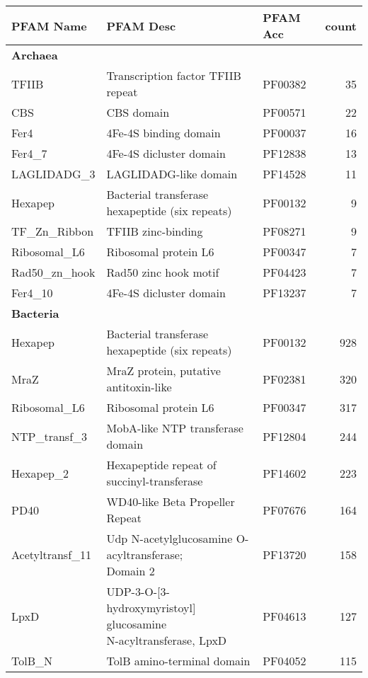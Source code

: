 \documentclass[a4,center,fleqn]{NAR}
\begin{document}
\clearpage
\begin{table*}[t]
\centering

\begin{tabular}{lllr}
  \hline
PFAM Name & PFAM Desc & PFAM Acc & count \\ 
  \hline
\multicolumn{4}{l}{\textbf{Archaea}}\\
TFIIB & Transcription factor TFIIB repeat & PF00382 &  35 \\ 
  CBS & CBS domain & PF00571 &  22 \\ 
  Fer4 & 4Fe-4S binding domain & PF00037 &  16 \\ 
  Fer4\_7 & 4Fe-4S dicluster domain & PF12838 &  13 \\ 
  LAGLIDADG\_3 & LAGLIDADG-like domain & PF14528 &  11 \\ 
  Hexapep & Bacterial transferase hexapeptide (six repeats) & PF00132 &   9 \\ 
  TF\_Zn\_Ribbon & TFIIB zinc-binding & PF08271 &   9 \\ 
  Ribosomal\_L6 & Ribosomal protein L6 & PF00347 &   7 \\ 
  Rad50\_zn\_hook & Rad50 zinc hook motif & PF04423 &   7 \\ 
  Fer4\_10 & 4Fe-4S dicluster domain & PF13237 &   7 \\ 
   \hline
\multicolumn{4}{l}{\textbf{Bacteria}}\\
Hexapep & Bacterial transferase hexapeptide (six repeats) & PF00132 & 928 \\ 
  MraZ & MraZ protein, putative antitoxin-like & PF02381 & 320 \\ 
  Ribosomal\_L6 & Ribosomal protein L6 & PF00347 & 317 \\ 
  NTP\_transf\_3 & MobA-like NTP transferase domain & PF12804 & 244 \\ 
  Hexapep\_2 & Hexapeptide repeat of succinyl-transferase & PF14602 & 223 \\ 
  PD40 & WD40-like Beta Propeller Repeat & PF07676 & 164 \\ 
  Acetyltransf\_11 & \makecell[l]{Udp N-acetylglucosamine O-acyltransferase; \\ Domain 2} & PF13720 & 158 \\ 
  LpxD & \makecell[l]{UDP-3-O-[3-hydroxymyristoyl] glucosamine\\ N-acyltransferase, LpxD} & PF04613 & 127 \\ 
  TolB\_N & TolB amino-terminal domain & PF04052 & 115 \\ 

\end{tabular}
\end{table*}
\end{document}
